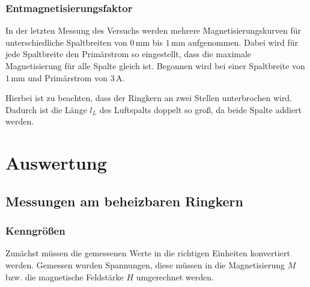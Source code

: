 \documentclass[12pt,a4paper]{scrartcl}
\numberwithin{equation}{section} %
\renewcommand{\[}{} %
\renewcommand{\]}{\noindent} %
\begin{document}
\hypertarget{entmagnetisierungsfaktor-1}{%
\subsubsection{Entmagnetisierungsfaktor}\label{entmagnetisierungsfaktor-1}}
In der letzten Messung des Versuchs werden mehrere Magnetisierungskurven für unterschiedliche Spaltbreiten von \(0\,\mathrm{mm}\) bis \(1\,\mathrm{mm}\) aufgenommen. Dabei wird für jede Spaltbreite den Primärstrom so eingestellt, dass die maximale Magnetisierung für alle Spalte gleich ist. Begonnen wird bei einer Spaltbreite von \(1\,\mathrm{mm}\) und Primärstrom von \(3\,\mathrm A\).

Hierbei ist zu beachten, dass der Ringkern an zwei Stellen unterbrochen wird. Dadurch ist die Länge \(l_L\) des Luftspalts doppelt so groß, da beide Spalte addiert werden.

\clearpage
\hypertarget{auswertung}{%
\section{Auswertung}\label{auswertung}}

\hypertarget{messungen-am-beheizbaren-ringkern}{%
\subsection{Messungen am beheizbaren
Ringkern}\label{messungen-am-beheizbaren-ringkern}}

\hypertarget{kenngruxf6uxdfen}{%
\subsubsection{Kenngrößen}\label{kenngruxf6uxdfen}}
Zunächst müssen die gemessenen Werte in die richtigen Einheiten konvertiert werden. Gemessen wurden Spannungen, diese müssen in die Magnetisierung \(M\) bzw. die magnetische Feldstärke \(H\) umgerechnet werden.
\end{document}
